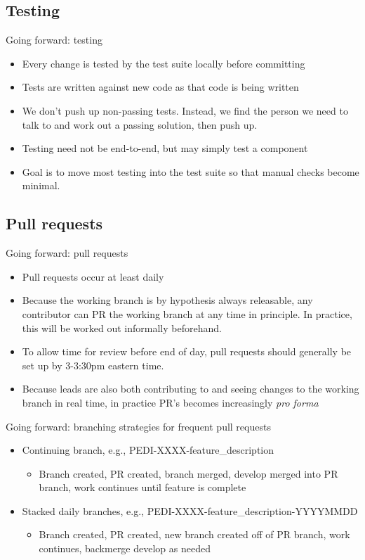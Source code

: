 \documentclass{beamer}
\begin{document}
	\subsection{Testing}
	\begin{frame}{Going forward: testing}
		\begin{itemize}
			\item Every change is tested by the test suite locally before committing \pause
			\item Tests are written against new code as that code is being written  \pause
			\item We don't push up non-passing tests. Instead, we find the person we need to talk to and work out a passing solution, then push up. \pause
			\item Testing need not be end-to-end, but may simply test a component \pause
			\item Goal is to move most testing into the test suite so that manual checks become minimal. \pause
		\end{itemize}
	\end{frame}
	\subsection{Pull requests}
	\begin{frame}{Going forward: pull requests}
		\begin{itemize}
			\item Pull requests occur at least daily \pause
			\item Because the working branch is by hypothesis always releasable, any contributor can PR the working branch at any time in principle. In practice, this will be worked out informally beforehand. \pause
			\item To allow time for review before end of day, pull requests should generally be set up by 3-3:30pm eastern time. \pause
			\item Because leads are also both contributing to and seeing changes to the working branch in real time, in practice PR's becomes increasingly \textit{pro forma} \pause
		\end{itemize}
	\end{frame}
	\begin{frame}{Going forward: branching strategies for frequent pull requests}
		\begin{itemize}
			\item Continuing branch, e.g., PEDI-XXXX-feature\_description \pause
			\begin{itemize}
				\item Branch created, PR created, branch merged, develop merged into PR branch, work continues until feature is complete \pause
			\end{itemize}
			\item Stacked daily branches, e.g., PEDI-XXXX-feature\_description-YYYYMMDD \pause
			\begin{itemize}
				\item Branch created, PR created, new branch created off of PR branch, work continues, backmerge develop as needed \pause
			\end{itemize}
		\end{itemize}
	\end{frame}
\end{document}
